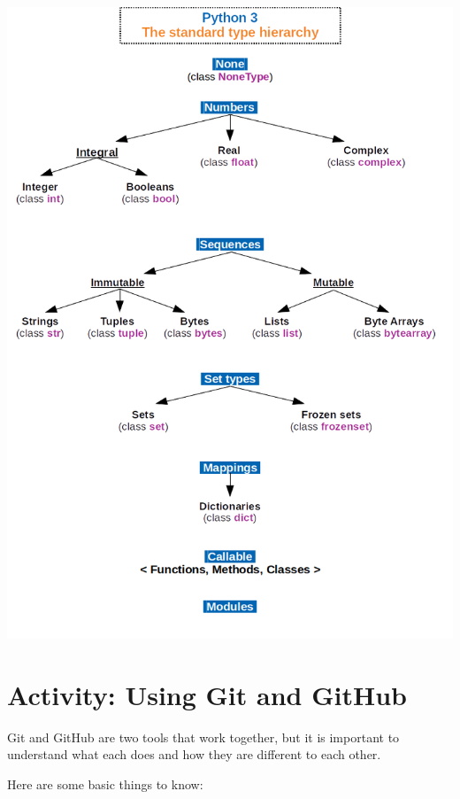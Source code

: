\documentclass[
  letterpaper,
  DIV=11,
  numbers=noendperiod]{scrreport}
\begin{document}
\includegraphics{topics/media/Python_3._The_standard_type_hierarchy.png}

\hypertarget{activity-using-git-and-github}{%
\chapter{Activity: Using Git and
GitHub}\label{activity-using-git-and-github}}

Git and GitHub are two tools that work together, but it is important to
understand what each does and how they are different to each other.

Here are some basic things to know:
\end{document}
